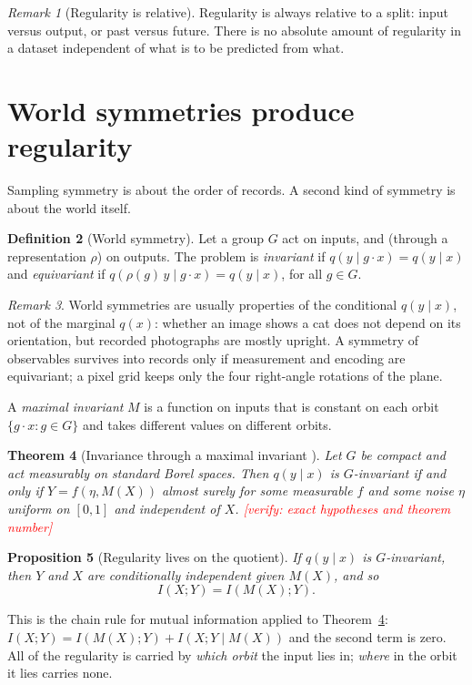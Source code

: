 \documentclass[11pt]{article}
\theoremstyle{definition}
\newtheorem{definition}{Definition}[section]
\theoremstyle{plain}
\newtheorem{theorem}[definition]{Theorem}
\newtheorem{proposition}[definition]{Proposition}
\theoremstyle{remark}
\newtheorem{remark}[definition]{Remark}
\newcommand{\verify}[1]{\textcolor{red}{[verify: #1]}}
\begin{document}
\begin{remark}[Regularity is relative]
Regularity is always relative to a split: input versus output, or
past versus future. There is no absolute amount of regularity in a
dataset independent of what is to be predicted from what.
\end{remark}

\section{World symmetries produce regularity}\label{sec:world}

Sampling symmetry is about the order of records. A second kind of
symmetry is about the world itself.

\begin{definition}[World symmetry]
Let a group $G$ act on inputs, and (through a representation $\rho$) on
outputs. The problem is \emph{invariant} if $q(y \mid g\cdot x) =
q(y\mid x)$ and \emph{equivariant} if $q(\rho(g)\, y \mid g\cdot x) =
q(y\mid x)$, for all $g\in G$.
\end{definition}

\begin{remark}
World symmetries are usually properties of the conditional $q(y\mid
x)$, not of the marginal $q(x)$: whether an image shows a cat does not
depend on its orientation, but recorded photographs are mostly upright.
A symmetry of observables survives into records only if measurement
and encoding are equivariant; a pixel grid keeps only the four
right-angle rotations of the plane.
\end{remark}

A \emph{maximal invariant} $M$ is a function on inputs that is constant
on each orbit $\{g\cdot x: g\in G\}$ and takes different values on
different orbits.

\begin{theorem}[Invariance through a maximal invariant \cite{bloemreddy2020}]
\label{thm:noise-outsourcing}
Let $G$ be compact and act measurably on standard Borel spaces. Then
$q(y\mid x)$ is $G$-invariant if and only if $Y = f(\eta, M(X))$
almost surely for some measurable $f$ and some noise $\eta$ uniform on
$[0,1]$ and independent of $X$. \verify{exact hypotheses and theorem
number}
\end{theorem}

\begin{proposition}[Regularity lives on the quotient]
If $q(y\mid x)$ is $G$-invariant, then $Y$ and $X$ are conditionally
independent given $M(X)$, and so
\[
I(X;Y) = I(M(X);Y).
\]
\end{proposition}
\noindent This is the chain rule for mutual information applied to
Theorem~\ref{thm:noise-outsourcing}: $I(X;Y) = I(M(X);Y) + I(X;Y\mid
M(X))$ and the second term is zero. All of the regularity is carried
by \emph{which orbit} the input lies in; \emph{where} in the orbit it
lies carries none.
\end{document}
